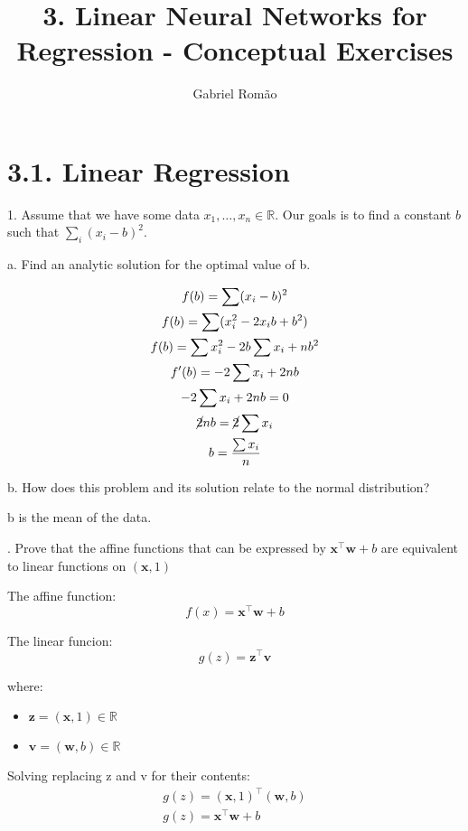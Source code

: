 \documentclass[12pt]{article}
\title{3. Linear Neural Networks for Regression - Conceptual Exercises}
\author{Gabriel Romão}
\begin{document}
    \maketitle

    \section*{3.1. Linear Regression}

    1. Assume that we have some data \(x_1, \dots, x_n \in \mathbb{R}\). Our goals is to find
    a constant \(b\) such that \(\sum_{i}{(x_i - b)}^2\).

    a. Find an analytic solution for the optimal value of b.

    \begin{gather*}
    f(b) = \sum (x_i - b)^2 \\
    f(b) = \sum (x_i^2 - 2x_i b + b^2) \\
    f(b) = \sum x_i^2 - 2b \sum x_i + n b^2 \\
    f'(b) = -2 \sum x_i + 2n b \\
    -2 \sum x_i + 2n b = 0 \\
    \cancel{2}n b = \cancel{2} \sum x_i \\
    b = \frac{\sum x_i}{n}
    \end{gather*}

    b. How does this problem and its solution relate to the normal distribution?

    b is the mean of the data.

    . Prove that the affine functions that can be expressed by
    \(\mathbf{x}^\top \mathbf{w} + b\) are equivalent to linear functions on \((\mathbf{x}, 1)\)

    The affine function:
    \[f(x) = \mathbf{x} ^ \top \mathbf{w} + b\]

    The linear funcion:
    \[g(z) = \mathbf{z} ^ \top \mathbf{v}\]

    where:
    \begin{itemize}
        \item \(\mathbf{z} = (\mathbf{x}, 1) \in \mathbb{R}\) 
        \item \(\mathbf{v} = (\mathbf{w}, b) \in \mathbb{R}\)
    \end{itemize}

    Solving replacing z and v for their contents:
    \begin{gather*}
        g(z) = (\mathbf{x}, 1) ^ \top (\mathbf{w}, b) \\
        g(z) = \mathbf{x} ^ \top \mathbf{w} + b
    \end{gather*}
\end{document}
